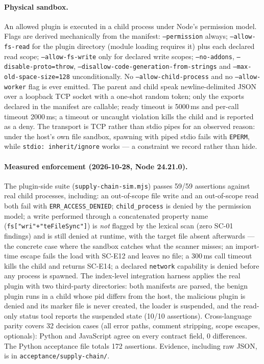 \paragraph{Physical sandbox.}
An allowed plugin is executed in a child process under Node's permission
model. Flags are derived mechanically from the manifest: \texttt{--permission}
always; \texttt{--allow-fs-read} for the plugin directory (module loading
requires it) plus each declared read scope; \texttt{--allow-fs-write} only for
declared write scopes; \texttt{--no-addons},
\texttt{--disable-proto=throw},
\texttt{--disallow-code-generation-from-strings} and
\texttt{--max-old-space-size=128} unconditionally. No
\texttt{--allow-child-process} and no \texttt{--allow-worker} flag is ever
emitted. The parent and child speak newline-delimited JSON over a loopback TCP
socket with a one-shot random token; only the exports declared in the manifest
are callable; ready timeout is 5000\,ms and per-call timeout 2000\,ms; a
timeout or uncaught violation kills the child and is reported as a deny.
The transport is TCP rather than stdio pipes for an observed reason: under the
host's own file sandbox, spawning with piped stdio fails with
\texttt{EPERM}, while \texttt{stdio: inherit/ignore} works --- a constraint we
record rather than hide.

\paragraph{Measured enforcement (2026-10-28, Node 24.21.0).}
The plugin-side suite (\texttt{supply-chain-sim.mjs}) passes 59/59
assertions against real child processes, including: an out-of-scope file
write and an out-of-scope read both fail with \texttt{ERR\_ACCESS\_DENIED};
\texttt{child\_process} is denied by the permission model; a write performed
through a concatenated property name (\texttt{fs["wri"+"teFileSync"]}) is
\emph{not} flagged by the lexical scan (zero SC-01 findings) and is still
denied at runtime, with the target file absent afterwards --- the concrete
case where the sandbox catches what the scanner misses; an import-time escape
fails the load with SC-E12 and leaves no file; a 300\,ms call timeout kills
the child and returns SC-E14; a declared \texttt{network} capability is denied
before any process is spawned. The index-level integration harness applies the
real plugin with two third-party directories: both manifests are parsed, the
benign plugin runs in a child whose pid differs from the host, the malicious
plugin is denied and its marker file is never created, the loader is
suspended, and the read-only status tool reports the suspended state (10/10
assertions). Cross-language parity covers 32 decision cases (all error paths,
comment stripping, scope escapes, optionals): Python and JavaScript agree on
every contract field, 0 differences. The Python acceptance file totals 172
assertions. Evidence, including raw JSON, is in
\texttt{acceptance/supply-chain/}.


